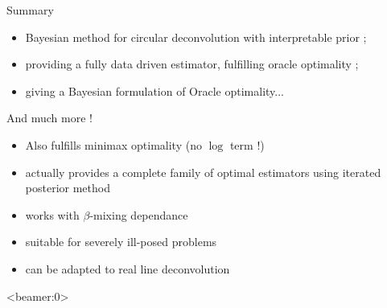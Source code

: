 \documentclass[10pt]{beamer}
\begin{document}
\begin{frame}{Summary}
\begin{itemize}
\item Bayesian method for circular deconvolution with interpretable prior ;
\item providing a fully data driven estimator, fulfilling oracle optimality ;
\item giving a Bayesian formulation of Oracle optimality...
\end{itemize}
And much more !
\begin{itemize}
\item Also fulfills minimax optimality (no $\log$ term !)
\item actually provides a complete family of optimal estimators using iterated posterior method
\item works with $\beta$-mixing dependance
\item suitable for severely ill-posed problems
\item can be adapted to real line deconvolution
\end{itemize}
\end{frame}

\begin{frame}<beamer:0>

\end{frame}


\end{document}

